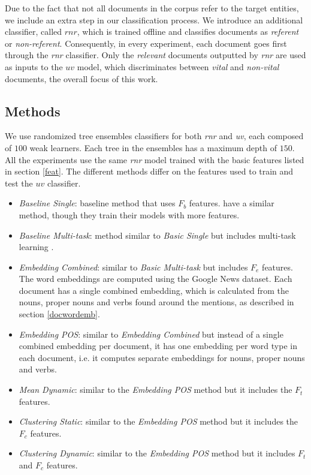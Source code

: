 \documentclass{sig-alternate}
\begin{document}
Due to the fact that not all documents in the corpus refer to the target entities, we include an extra step in our classification process. We introduce an additional classifier, called $rnr$, which is trained offline and classifies documents as \emph{referent} or \emph{non-referent}.
Consequently, in every experiment, each document goes first through the \emph{rnr} classifier. Only the \emph{relevant} documents outputted by \emph{rnr} are used as inputs to the $uv$ model, which discriminates between \emph{vital} and \emph{non-vital} documents, the overall focus of this work.

\subsection{Methods}
\label{expe}

We use randomized tree ensembles classifiers \cite{GEW06a} for both \emph{rnr} and \emph{uv}, each composed of $100$ weak learners. Each tree in the ensembles has a maximum depth of $150$.
%
All the experiments use the same \emph{rnr} model trained with the basic features listed in section \ref{feat}.
The different methods differ on the features used to train and test the $uv$ classifier.

\begin{itemize}
  \item {\textit{Baseline Single}}: baseline method that uses $F_b$ features. \citet{jingang13, bellogin13} have a similar method, though they train their models with more features.
  \item {\textit{Baseline Multi-task}}: method similar to {\textit{Basic Single}} but includes multi-task learning \cite{Caruana93multitasklearning}.
  \item {\textit{Embedding Combined}}: similar to {\textit{Basic Multi-task}} but includes $F_e$ features. The word embeddings are computed using the Google News dataset. Each document has a single combined embedding, which is calculated from the nouns, proper nouns and verbs found around the mentions, as described in section \ref{docwordemb}.
  \item {\textit{Embedding POS}}: similar to {\textit{Embedding Combined}} but instead of a single combined embedding per document, it has one embedding per word type in each document, i.e. it computes separate embeddings for nouns, proper nouns and verbs. %
  \item {\textit{Mean Dynamic}}: similar to the {\textit{Embedding POS}} method but it includes the $F_t$ features.
  \item {\textit{Clustering Static}}: similar to the {\textit{Embedding POS}} method but it includes the $F_c$ features.
  \item {\textit{Clustering Dynamic}}: similar to the {\textit{Embedding POS}} method but it includes $F_t$ and $F_c$ features.
\end{itemize}
\end{document}
